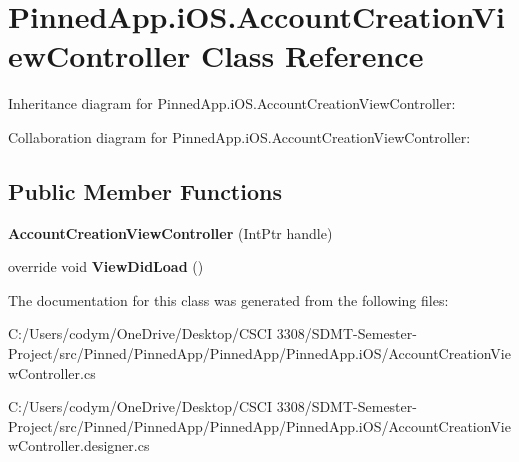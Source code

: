 \hypertarget{class_pinned_app_1_1i_o_s_1_1_account_creation_view_controller}{}\section{Pinned\+App.\+i\+O\+S.\+Account\+Creation\+View\+Controller Class Reference}
\label{class_pinned_app_1_1i_o_s_1_1_account_creation_view_controller}


Inheritance diagram for Pinned\+App.\+i\+O\+S.\+Account\+Creation\+View\+Controller\+:


Collaboration diagram for Pinned\+App.\+i\+O\+S.\+Account\+Creation\+View\+Controller\+:
\subsection*{Public Member Functions}
\begin{DoxyCompactItemize}
\item 
\mbox{\label{class_pinned_app_1_1i_o_s_1_1_account_creation_view_controller_a026974abb09cb5132cfc1f7c2a67affa}} 
{\bfseries Account\+Creation\+View\+Controller} (Int\+Ptr handle)
\item 
\mbox{\label{class_pinned_app_1_1i_o_s_1_1_account_creation_view_controller_a204e702168c02c4b220936d3837188fc}} 
override void {\bfseries View\+Did\+Load} ()
\end{DoxyCompactItemize}


The documentation for this class was generated from the following files\+:\begin{DoxyCompactItemize}
\item 
C\+:/\+Users/codym/\+One\+Drive/\+Desktop/\+C\+S\+C\+I 3308/\+S\+D\+M\+T-\/\+Semester-\/\+Project/src/\+Pinned/\+Pinned\+App/\+Pinned\+App/\+Pinned\+App.\+i\+O\+S/Account\+Creation\+View\+Controller.\+cs\item 
C\+:/\+Users/codym/\+One\+Drive/\+Desktop/\+C\+S\+C\+I 3308/\+S\+D\+M\+T-\/\+Semester-\/\+Project/src/\+Pinned/\+Pinned\+App/\+Pinned\+App/\+Pinned\+App.\+i\+O\+S/Account\+Creation\+View\+Controller.\+designer.\+cs\end{DoxyCompactItemize}
